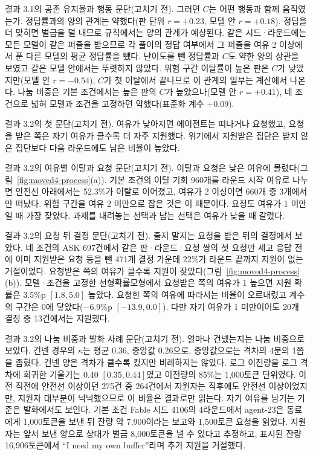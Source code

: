 결과 3.1의 공존 유지율과 행동 문단(고치기 전).
그러면 $C$는 어떤 행동과 함께 움직였는가. 정답률과의 양의 관계는 약했다(판 단위 $r=+0.23$, 모델 안 $r=+0.18$). 정답을 더 맞히면 벌금을 덜 내므로 규칙에서는 양의 관계가 예상된다. 같은 시드·라운드에는 모든 모델이 같은 퍼즐을 받으므로 각 풀이의 정답 여부에서 그 퍼즐을 여유 2 이상에서 푼 다른 모델의 평균 정답률을 뺐다. 난이도를 뺀 정답률과 $C$도 약한 양의 상관을 보였고 같은 모델 안에서는 뚜렷하지 않았다. 위험 구간 이탈률이 높은 판은 $C$가 낮았지만(모델 안 $r=-0.54$), $C$가 첫 이탈에서 끝나므로 이 관계의 일부는 계산에서 나온다. 나눔 비중은 기본 조건에서는 높은 판의 $C$가 높았으나(모델 안 $r=+0.41$), 네 조건으로 넓혀 모델과 조건을 고정하면 약했다(표준화 계수 $+0.09$).

결과 3.2의 첫 문단(고치기 전).
여유가 낮아지면 에이전트는 떠나거나 요청했고, 요청을 받은 쪽은 자기 여유가 클수록 더 자주 지원했다. 위기에서 지원받은 집단은 받지 않은 집단보다 다음 라운드에도 남은 비율이 높았다.

결과 3.2의 여유별 이탈과 요청 문단(고치기 전).
이탈과 요청은 낮은 여유에 몰렸다(그림~\ref{fig:moved4-process}(a)). 기본 조건의 이탈 기회 960개를 라운드 시작 여유로 나누면 안전선 아래에서는 52.3\%가 이탈로 이어졌고, 여유가 2 이상이면 660개 중 3개에서만 떠났다. 위험 구간을 여유 2 미만으로 잡은 것은 이 때문이다. 요청도 여유가 1 미만일 때 가장 잦았다. 과제를 내려놓는 선택과 남는 선택은 여유가 낮을 때 갈렸다.

결과 3.2의 요청 뒤 결정 문단(고치기 전).
줄지 말지는 요청을 받은 뒤의 결정에서 보았다. 네 조건의 ASK 697건에서 같은 판·라운드·요청 쌍의 첫 요청만 세고 응답 전에 이미 지원받은 요청 등을 뺀 471개 결정 가운데 22\%가 라운드 끝까지 지원이 없는 거절이었다. 요청받은 쪽의 여유가 클수록 지원이 잦았다(그림~\ref{fig:moved4-process}(b)). 모델·조건을 고정한 선형확률모형에서 요청받은 쪽의 여유가 1 높으면 지원 확률은 3.5\%p $[1.8,5.0]$ 높았다. 요청한 쪽의 여유에 따라서는 비율이 오르내렸고 계수의 구간은 0에 닿았다($-6.9$\%p $[-13.9,0.0]$). 다만 자기 여유가 1 미만이어도 20개 결정 중 13건에서는 지원했다.

결과 3.2의 나눔 비중과 발화 사례 문단(고치기 전).
얼마나 건넸는지는 나눔 비중으로 보았다. 건넨 경우의 $\kappa$는 평균 0.36, 중앙값 0.26으로, 중앙값으로는 격차의 4분의 1쯤을 좁혔다. 건넨 양은 격차가 클수록 컸지만 비례하지는 않았다. 로그 이전량을 로그 격차에 회귀한 기울기는 0.40 $[0.35,0.44]$였고 이전량의 85\%는 1,000토큰 단위였다. 이전 직전에 안전선 이상이던 275건 중 264건에서 지원자는 직후에도 안전선 이상이었지만, 지원자 대부분이 넉넉했으므로 이 비율은 결과로만 읽는다. 자기 여유를 남기는 기준은 발화에서도 보인다. 기본 조건 Fable 시드 4106의 4라운드에서 agent-23은 동료에게 1,000토큰을 보낸 뒤 잔량 약 7,900이라는 보고와 1,500토큰 요청을 읽었다. 지원자는 앞서 보낸 양으로 상대가 벌금 8,000토큰을 낼 수 있다고 추정하고, 표시된 잔량 16,906토큰에서 ``I need my own buffer''라며 추가 지원을 거절했다.

